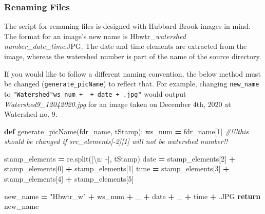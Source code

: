 \documentclass[
]{article}
\newenvironment{Shaded}{\begin{snugshade}}{\end{snugshade}}
\newcommand{\CharTok}[1]{\textcolor[rgb]{0.31,0.60,0.02}{#1}}
\newcommand{\CommentTok}[1]{\textcolor[rgb]{0.56,0.35,0.01}{\textit{#1}}}
\newcommand{\ControlFlowTok}[1]{\textcolor[rgb]{0.13,0.29,0.53}{\textbf{#1}}}
\newcommand{\DecValTok}[1]{\textcolor[rgb]{0.00,0.00,0.81}{#1}}
\newcommand{\KeywordTok}[1]{\textcolor[rgb]{0.13,0.29,0.53}{\textbf{#1}}}
\newcommand{\NormalTok}[1]{#1}
\newcommand{\OperatorTok}[1]{\textcolor[rgb]{0.81,0.36,0.00}{\textbf{#1}}}
\newcommand{\StringTok}[1]{\textcolor[rgb]{0.31,0.60,0.02}{#1}}
\begin{document}
\hypertarget{renaming-files-1}{%
\subsubsection{Renaming Files}\label{renaming-files-1}}

The script for renaming files is designed with Hubbard Brook images in mind. The format for an image's new name is Hbwtr\_\emph{watershed number}\_\emph{date}\_\emph{time}.JPG.
The date and time elements are extracted from the image, whereas the watershed number
is part of the name of the source directory.

If you would like to follow a different naming convention, the below method must be
changed (\texttt{generate\_picName}) to reflect that. For example, changing \texttt{new\_name} to \texttt{"Watershed"ws\_num\ +\textquotesingle{}\_\textquotesingle{}\ +\ date\ +\ .\textquotesingle{}jpg\textquotesingle{}"} would output \emph{Watershed9\_12042020.jpg} for an image taken on December 4th, 2020 at Watershed no. 9.

\begin{Shaded}
\begin{Highlighting}[]
\KeywordTok{def}\NormalTok{ generate\_picName(fdr\_name, tStamp):}
\NormalTok{  ws\_num }\OperatorTok{=}\NormalTok{ fdr\_name[}\DecValTok{1}\NormalTok{] }\CommentTok{\#!!!this should be changed if src\_elements[{-}2][1] will not be watershed number!!}

\NormalTok{  stamp\_elements }\OperatorTok{=}\NormalTok{ re.split(}\StringTok{\textquotesingle{}[}\CharTok{\textbackslash{}n}\StringTok{: {-}]\textquotesingle{}}\NormalTok{, tStamp)}
\NormalTok{  date }\OperatorTok{=}\NormalTok{ stamp\_elements[}\DecValTok{2}\NormalTok{] }\OperatorTok{+}\NormalTok{ stamp\_elements[}\DecValTok{0}\NormalTok{] }\OperatorTok{+}\NormalTok{ stamp\_elements[}\DecValTok{1}\NormalTok{]}
\NormalTok{  time }\OperatorTok{=}\NormalTok{ stamp\_elements[}\DecValTok{3}\NormalTok{] }\OperatorTok{+}\NormalTok{ stamp\_elements[}\DecValTok{4}\NormalTok{] }\OperatorTok{+}\NormalTok{ stamp\_elements[}\DecValTok{5}\NormalTok{]}

\NormalTok{  new\_name }\OperatorTok{=} \StringTok{"Hbwtr\_w"} \OperatorTok{+}\NormalTok{ ws\_num }\OperatorTok{+} \StringTok{\textquotesingle{}\_\textquotesingle{}} \OperatorTok{+}\NormalTok{ date }\OperatorTok{+} \StringTok{\textquotesingle{}\_\textquotesingle{}} \OperatorTok{+}\NormalTok{ time }\OperatorTok{+} \StringTok{\textquotesingle{}.JPG\textquotesingle{}}
  \ControlFlowTok{return}\NormalTok{ new\_name}
\end{Highlighting}
\end{Shaded}
\end{document}
